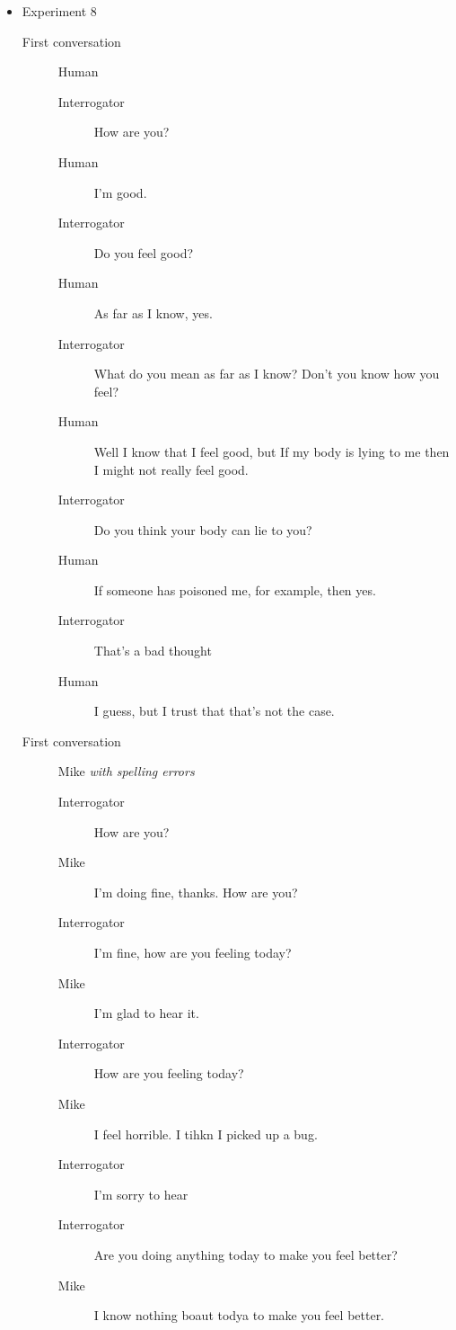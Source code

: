 \begin{itemize}
   \item Experiment 8
      \begin{description}
         \item [First conversation] Human
            \begin{description}
               \item [Interrogator] How are you?
               \item [Human] I'm good.
               \item [Interrogator] Do you feel good?
               \item [Human] As far as I know, yes.
               \item [Interrogator] What do you mean as far as I know? Don't you know how you feel?
               \item [Human] Well I know that I feel good, but If my body is lying to me then I might not really feel good.
               \item [Interrogator] Do you think your body can lie to you?
               \item [Human] If someone has poisoned me, for example, then yes.
               \item [Interrogator] That's a bad thought
               \item [Human] I guess, but I trust that that's not the case.
            \end{description}
         \item [First conversation] Mike \textit{with spelling errors}
            \begin{description}
               \item [Interrogator] How are you?
               \item [Mike] I'm doing fine, thanks. How are you?
               \item [Interrogator] I'm fine, how are you feeling today?
               \item [Mike] I'm glad to hear it.
               \item [Interrogator] How are you feeling today?
               \item [Mike] I feel horrible. I tihkn I picked up a bug.
               \item [Interrogator] I'm sorry to hear
               \item [Interrogator] Are you doing anything today to make you feel better?
               \item [Mike] I know nothing boaut todya to make you feel better.
            \end{description}

\end{description}
\end{itemize}
